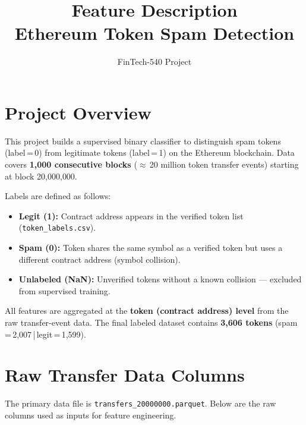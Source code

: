 \documentclass[11pt, a4paper]{article}
\title{\textbf{Feature Description}\\[0.4em]
       \large Ethereum Token Spam Detection}
\author{FinTech-540 Project}
\date{}
\begin{document}
\maketitle
\thispagestyle{empty}

\section{Project Overview}

This project builds a supervised binary classifier to distinguish spam tokens (label\,=\,0)
from legitimate tokens (label\,=\,1) on the Ethereum blockchain.
Data covers \textbf{1,000 consecutive blocks} ($\approx$\,20 million token transfer events)
starting at block 20{,}000{,}000.

Labels are defined as follows:
\begin{itemize}
  \item \textbf{Legit (1):} Contract address appears in the verified token list (\texttt{token\_labels.csv}).
  \item \textbf{Spam (0):} Token shares the same symbol as a verified token but uses a different contract address (symbol collision).
  \item \textbf{Unlabeled (NaN):} Unverified tokens without a known collision --- excluded from supervised training.
\end{itemize}

All features are aggregated at the \textbf{token (contract address) level} from the raw transfer-event data.
The final labeled dataset contains \textbf{3,606 tokens} (spam\,=\,2,007\,|\,legit\,=\,1,599).

\section{Raw Transfer Data Columns}

The primary data file is \texttt{transfers\_20000000.parquet}.
Below are the raw columns used as inputs for feature engineering.
\end{document}
